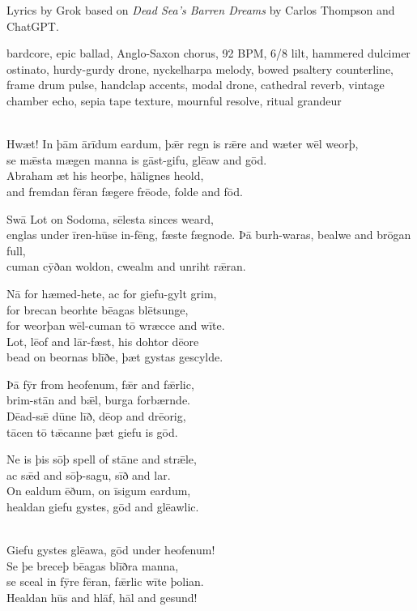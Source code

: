 
\begin{notes}
Lyrics by Grok based on \emph{Dead Sea's Barren Dreams} by Carlos Thompson and ChatGPT.
\end{notes}
\begin{style}
bardcore, epic ballad, Anglo-Saxon chorus, 92 BPM, 6/8 lilt, hammered dulcimer ostinato, hurdy-gurdy drone, nyckelharpa melody, bowed psaltery counterline, frame drum pulse, handclap accents, modal drone, cathedral reverb, vintage chamber echo, sepia tape texture, mournful resolve, ritual grandeur
\end{style}
\begin{lyrics}
\\
Hwæt! In þām ārīdum eardum, þǣr regn is rǣre and wæter wēl weorþ,\\
se mǣsta mægen manna is gāst-gifu, glēaw and gōd.\\
Abraham æt his heorþe, hālignes heold,\\
and fremdan fēran fægere frēode, folde and fōd.

Swā Lot on Sodoma, sēlesta sinces weard,\\
englas under īren-hūse in-fēng, fæste fægnode.
Þā burh-waras, bealwe and brōgan full,\\
cuman cȳðan woldon, cwealm and unriht rǣran.

Nā for hæmed-hete, ac for giefu-gylt grim,\\
for brecan beorhte bēagas blētsunge,\\
for weorþan wēl-cuman tō wræcce and wīte.\\
Lot, lēof and lār-fæst, his dohtor dēore\\
bead on beornas blīðe, þæt gystas gescylde.

Þā fȳr from heofenum, fǣr and fǣrlic,\\
brim-stān and bǣl, burga forbærnde.\\
Dēad-sǣ dūne līð, dēop and drēorig,\\
tācen tō tǣcanne þæt giefu is gōd.

Ne is þis sōþ spell of stāne and strǣle,\\
ac sǣd and sōþ-sagu, sīð and lar.\\
On ealdum ēðum, on īsigum eardum,\\
healdan giefu gystes, gōd and glēawlic.

\\
Giefu gystes glēawa, gōd under heofenum!\\
Se þe breceþ bēagas blīðra manna,\\
se sceal in fȳre fēran, fǣrlic wīte þolian.\\
Healdan hūs and hlāf, hāl and gesund!
\end{lyrics}

